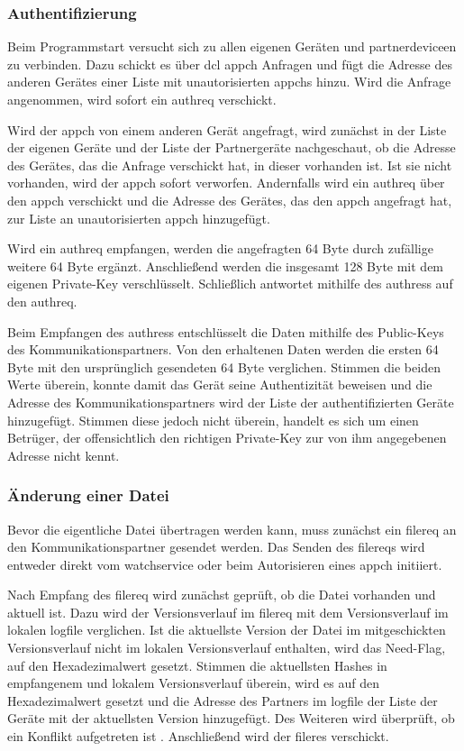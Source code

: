 \subsubsection{Authentifizierung}
Beim Programmstart versucht sich \sblit zu allen eigenen Geräten und \gls{partnerdevice}en zu verbinden. Dazu schickt es über \gls{dcl} \gls{appch} Anfragen und fügt die Adresse des anderen Gerätes einer Liste mit unautorisierten \gls{appch}s hinzu. Wird die Anfrage angenommen, wird sofort ein \gls{authreq} verschickt. 

Wird der \gls{appch} von einem anderen Gerät angefragt, wird zunächst in der Liste der eigenen Geräte  und der Liste der Partnergeräte  nachgeschaut, ob die Adresse des Gerätes, das die Anfrage verschickt hat, in dieser vorhanden ist. Ist sie nicht vorhanden, wird der \gls{appch} sofort verworfen. Andernfalls wird ein \gls{authreq} über den \gls{appch} verschickt und die Adresse des Gerätes, das den \gls{appch} angefragt hat, zur Liste an unautorisierten \gls{appch} hinzugefügt.

Wird ein \gls{authreq} empfangen, werden die angefragten 64 Byte durch zufällige weitere 64 Byte ergänzt. Anschließend werden die insgesamt 128 Byte mit dem eigenen Private-Key verschlüsselt. Schließlich antwortet \sblit mithilfe des \gls{authres}s auf den \gls{authreq}.

Beim Empfangen des \gls{authres}s entschlüsselt \sblit die Daten mithilfe des Public-Keys des Kommunikationspartners. Von den erhaltenen Daten werden die ersten 64 Byte mit den ursprünglich gesendeten 64 Byte verglichen. Stimmen die beiden Werte überein, konnte damit das Gerät seine Authentizität beweisen und die Adresse des Kommunikationspartners wird der Liste der authentifizierten Geräte hinzugefügt. Stimmen diese jedoch nicht überein, handelt es sich um einen Betrüger, der offensichtlich den richtigen Private-Key zur von ihm angegebenen Adresse nicht kennt.

\subsubsection{Änderung einer Datei}
Bevor die eigentliche Datei übertragen werden kann, muss zunächst ein \gls{filereq} an den Kommunikationspartner gesendet werden. Das Senden des \gls{filereq}s wird entweder direkt vom \gls{watchservice} oder beim Autorisieren eines \gls{appch} initiiert.

Nach Empfang des \gls{filereq} wird zunächst geprüft, ob die Datei vorhanden und aktuell ist. Dazu wird der Versionsverlauf im \gls{filereq} mit dem Versionsverlauf im lokalen \gls{logfile} verglichen. Ist die aktuellste Version der Datei im mitgeschickten Versionsverlauf nicht im lokalen Versionsverlauf enthalten, wird das Need-Flag, auf den Hexadezimalwert  gesetzt. Stimmen die aktuellsten Hashes in empfangenem und lokalem Versionsverlauf überein, wird es auf den Hexadezimalwert  gesetzt und die Adresse des Partners im \gls{logfile} der Liste der Geräte mit der aktuellsten Version hinzugefügt. Des Weiteren wird überprüft, ob ein Konflikt aufgetreten ist . Anschließend wird der \gls{fileres} verschickt.

